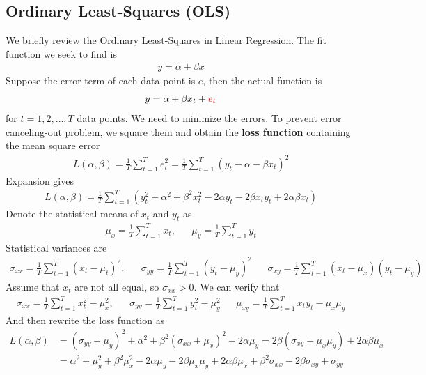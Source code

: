 \documentclass[10pt,a4paper]{book}
\newcommand{\red}[1]{\textcolor{red}{#1}}
\theoremstyle{definition}\newtheorem{definition}{Definition}
\theoremstyle{definition}\newtheorem{fact}{Fact}
\theoremstyle{definition}\newtheorem{ex}{Ex.}
\theoremstyle{definition}\newtheorem{project}{Project}
\theoremstyle{definition}\newtheorem{problem}{Problem}
\theoremstyle{definition}\newtheorem{example}{Example}
\numberwithin{theorem}{chapter}
\numberwithin{corollary}{chapter}
\numberwithin{assumption}{chapter}
\numberwithin{definition}{chapter}
\numberwithin{prop}{chapter}
\numberwithin{notation}{chapter}
\numberwithin{problem}{chapter}
\numberwithin{example}{chapter}
\numberwithin{fact}{chapter}
\numberwithin{ex}{chapter}
\begin{document}
	\subsection{Ordinary Least-Squares (OLS)}
	We briefly review the Ordinary Least-Squares in Linear Regression. The fit function we seek to find is
	\begin{align*}
		y = \alpha + \beta x 
	\end{align*}
	Suppose the error term of each data point is $e$, then the actual function is
	\begin{align*}
		y = \alpha + \beta x_t + \red{e_t} 
	\end{align*}
	for $t=1,2,\dots, T$ data points. We need to minimize the errors. To prevent error canceling-out problem, we square them and obtain the \textbf{loss function} containing the mean square error
	\begin{align*}
		L(\alpha,\beta) = \frac{1}{T} \sum^T_{t=1} e^2_t = \frac{1}{T} \sum^T_{t=1} (y_t - \alpha - \beta x_t)^2 
	\end{align*}
	Expansion gives
	\begin{align*}
		L(\alpha,\beta) = \frac{1}{T} \sum^T_{t=1} (y_t^2 + \alpha^2 + \beta^2 x^2_t - 2\alpha y_t - 2\beta x_t y_t + 2\alpha\beta x_t) 
	\end{align*}
	Denote the statistical means of $x_t$ and $y_t$ as
	\begin{align*}
		\mu_x = \frac{1}{T} \sum^T_{t=1} x_t, &   & \mu_y = \frac{1}{T} \sum^T_{t=1} y_t 
	\end{align*}
	Statistical variances are
	\begin{align*}
		\sigma_{xx} = \frac{1}{T} \sum^T_{t=1} (x_t - \mu_t)^2, &   & \sigma_{yy} = \frac{1}{T} \sum^T_{t=1} (y_t - \mu_y)^2 &   & \sigma_{xy} = \frac{1}{T} \sum^T_{t=1} (x_t - \mu_x)(y_t - \mu_y) 
	\end{align*}
	Assume that $x_t$ are not all equal, so $\sigma_{xx} > 0$. We can verify that
	\begin{align*}
		\sigma_{xx} = \frac{1}{T} \sum^T_{t=1} x^2_t - \mu_x^2, &   & \sigma_{yy} = \frac{1}{T} \sum^T_{t=1} y^2_t - \mu_y^2 &   & \mu_{xy} = \frac{1}{T} \sum^T_{t=1} x_t y_t - \mu_x \mu_y 
	\end{align*}
	And then rewrite the loss function as
	\begin{align*}
		L(\alpha, \beta) & = (\sigma_{yy} + \mu_y)^2 + \alpha^2 + \beta^2 (\sigma_{xx} + \mu_x)^2 - 2\alpha\mu_y = 2\beta(\sigma_{xy} + \mu_x\mu_y) + 2\alpha\beta \mu_x      \\
		& = \alpha^2 + \mu_y^2 + \beta^2\mu_x^2 - 2\alpha\mu_y - 2\beta\mu_x\mu_y + 2\alpha\beta\mu_x + \beta^2\sigma_{xx} - 2\beta\sigma_{xy} + \sigma_{yy} 
	\end{align*}
\end{document}
